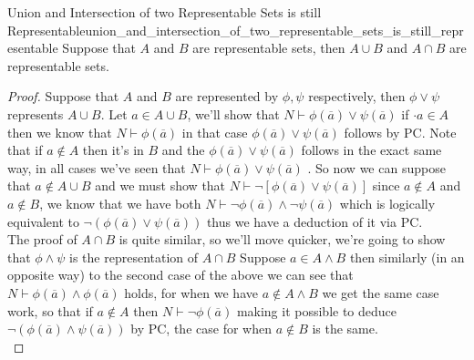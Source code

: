 \begin{proposition}{Union and Intersection of two Representable Sets is still
Representable}{union_and_intersection_of_two_representable_sets_is_still_representable}
Suppose that \( A \) and \( B \) are representable sets, then \( A \cup B \) and
\( A \cap B \) are representable sets.
\end{proposition}
\begin{proof}
    Suppose that \( A \) and \( B \) are represented by \( \phi , \psi  \)
    respectively, then \( \phi \lor \psi  \) represents \( A \cup B \).
    Let \( a \in  A \cup  B \), we'll show that \( N \vdash \phi \left(
    \overline{a} \right) \lor \psi \left( \overline{a}  \right)  \) if \( \cdot
    a \in  A\) then we know that \( N \vdash \phi \left( \overline{a}  \right)
    \) in that case \( \phi \left( \overline{a}  \right) \lor \psi \left(
    \overline{a}  \right)  \) follows by PC. Note that if \( a \not\in A \) then
    it's in \( B \) and the \( \phi \left( \overline{a}  \right) \lor \psi
    \left( \overline{a}  \right)  \) follows in the exact same way, in all cases
    we've seen that \( N \vdash \phi \left( \overline{a}  \right) \lor \psi
    \left( \overline{a}  \right)   \) .
    So now we can suppose that \( a \not\in A \cup  B \) and we must show that \( N
    \vdash  \neg  \left[ \phi \left( \overline{a}  \right) \lor \psi \left(
    \overline{a}  \right) \right]   \) since \( a \not\in A \) and \( a \not\in
    B\), we know that we have both \( N \vdash \neg  \phi \left(
    \overline{a}  \right)  \land \neg \psi \left( \overline{a}  \right)  \)
    which is logically equivalent to \( \neg \left( \phi \left( \overline{a}
    \right) \lor \psi \left( \overline{a}  \right)  \right)  \) thus we have a
    deduction of it via PC.\\
    The proof of \( A \cap B \) is quite similar, so we'll move quicker, we're
    going to show that  \( \phi \land \psi  \) is the representation of \( A
    \cap B \) Suppose \( a \in  A \land B  \) then similarly (in an opposite
    way) to the second case of the above we can see that \( N \vdash \phi \left(
    \overline{a} \right) \land  \phi \left( \overline{a}  \right)  \) holds, for
    when we have \( a \not\in A \land B \) we get the same case work, so that if
    \( a \not\in A \) then \( N \vdash \neg \phi \left( \overline{a}  \right)
    \) making it possible to deduce \( \neg \left( \phi \left( \overline{a}
    \right) \land \psi \left( \overline{a}  \right)  \right)  \) by PC, the case
    for when \( a \not\in B \) is the same. \\

\end{proof}
